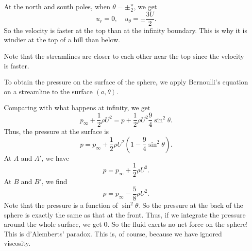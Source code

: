 \documentclass[a4paper]{article}
\begin{document}
\begin{eg}
  At the north and south poles, when $\theta = \pm \frac{\pi}{2}$, we get
  \[
    u_r = 0,\quad u_\theta = \pm \frac{3U}{2}.
  \]
  So the velocity is faster at the top than at the infinity boundary. This is why it is windier at the top of a hill than below.
  \begin{center}
  \end{center}
  Note that the streamlines are closer to each other near the top since the velocity is faster.

  To obtain the pressure on the surface of the sphere, we apply Bernoulli's equation on a streamline to the surface $(a, \theta)$.

  Comparing with what happens at infinity, we get
  \[
    p_\infty + \frac{1}{2} \rho U^2 = p + \frac{1}{2}\rho U^2 \frac{9}{4} \sin^2 \theta.
  \]
  Thus, the pressure at the surface is
  \[
    p = p_\infty + \frac{1}{2}\rho U^2 \left(1 - \frac{9}{4} \sin^2 \theta\right).
  \]
  At $A$ and $A'$, we have
  \[
    p = p_\infty + \frac{1}{2}\rho U^2.
  \]
  At $B$ and $B'$, we find
  \[
    p = p_\infty - \frac{5}{8} \rho U^2.
  \]
  Note that the pressure is a function of $\sin^2 \theta$. So the pressure at the back of the sphere is exactly the same as that at the front. Thus, if we integrate the pressure around the whole surface, we get $0$. So the fluid exerts no net force on the sphere! This is d'Alemberts' paradox. This is, of course, because we have ignored viscosity.


\end{eg}
\end{document}
